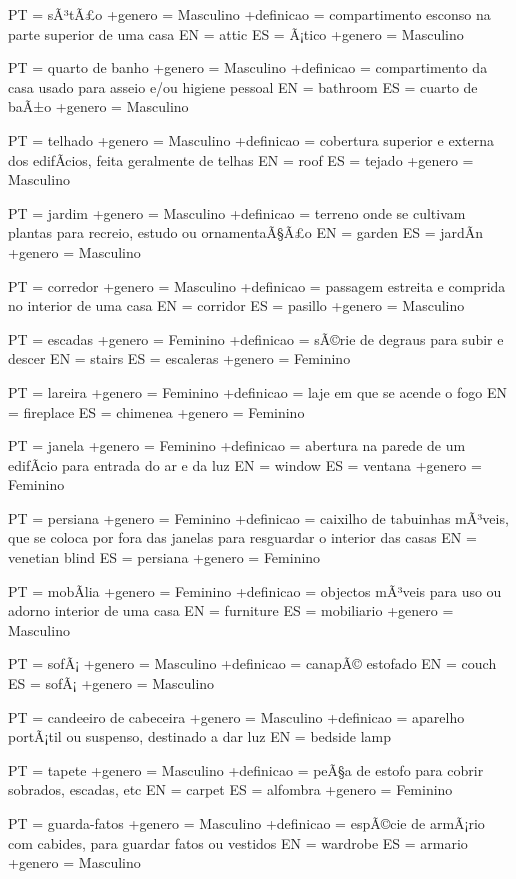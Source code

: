 \documentclass[a4paper]{article}
\begin{document}
PT = sÃ³tÃ£o
+genero = Masculino
+definicao = compartimento esconso na parte superior de uma casa
EN = attic
ES = Ã¡tico
+genero = Masculino

PT = quarto de banho
+genero = Masculino
+definicao = compartimento da casa usado para asseio e/ou higiene pessoal
EN = bathroom
ES = cuarto de baÃ±o
+genero = Masculino

PT = telhado
+genero = Masculino
+definicao = cobertura superior e externa dos edifÃ\-cios, feita geralmente de telhas
EN = roof
ES = tejado
+genero = Masculino

PT = jardim
+genero = Masculino
+definicao = terreno onde se cultivam plantas para recreio, estudo ou ornamentaÃ§Ã£o
EN = garden
ES = jardÃ\-n
+genero = Masculino

PT = corredor
+genero = Masculino
+definicao = passagem estreita e comprida no interior de uma casa
EN = corridor
ES = pasillo
+genero = Masculino

PT = escadas
+genero = Feminino
+definicao = sÃ©rie de degraus para subir e descer
EN = stairs
ES = escaleras
+genero = Feminino

PT = lareira
+genero = Feminino
+definicao = laje em que se acende o fogo
EN = fireplace
ES = chimenea
+genero = Feminino

PT = janela
+genero = Feminino
+definicao = abertura na parede de um edifÃ\-cio para entrada do ar e da luz
EN = window
ES = ventana
+genero = Feminino

PT = persiana
+genero = Feminino
+definicao = caixilho de tabuinhas mÃ³veis, que se coloca por fora das janelas para resguardar o interior das casas
EN = venetian blind
ES = persiana
+genero = Feminino

PT = mobÃ\-lia
+genero = Feminino
+definicao = objectos mÃ³veis para uso ou adorno interior de uma casa
EN = furniture
ES = mobiliario
+genero = Masculino

PT = sofÃ¡
+genero = Masculino
+definicao = canapÃ© estofado
EN = couch
ES = sofÃ¡
+genero = Masculino

PT = candeeiro de cabeceira
+genero = Masculino
+definicao = aparelho portÃ¡til ou suspenso, destinado a dar luz
EN = bedside lamp

PT = tapete
+genero = Masculino
+definicao = peÃ§a de estofo para cobrir sobrados, escadas, etc
EN = carpet
ES = alfombra
+genero = Feminino

PT = guarda-fatos
+genero = Masculino
+definicao = espÃ©cie de armÃ¡rio com cabides, para guardar fatos ou vestidos
EN = wardrobe
ES = armario
+genero = Masculino
\end{document}
